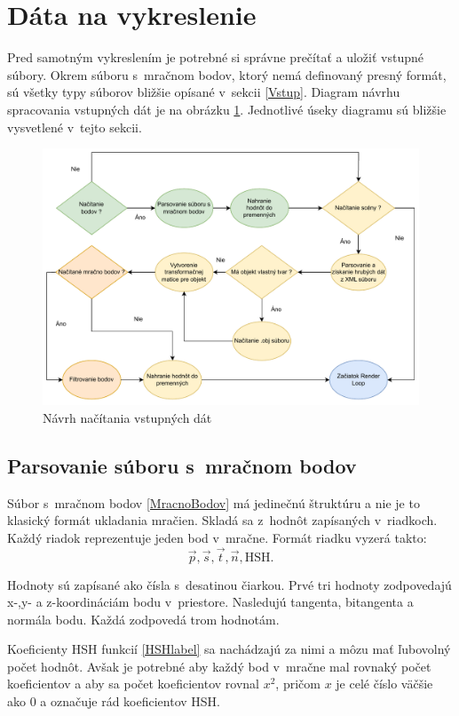 \section{Dáta na vykreslenie}
\label{DataVykreslenie}
\label{DataNavrh}
Pred samotným vykreslením je potrebné si správne prečítať a uložiť vstupné súbory. Okrem súboru s~mračnom bodov, ktorý nemá definovaný presný formát, sú všetky typy súborov bližšie opísané v~sekcii \ref{Vstup}. Diagram návrhu spracovania vstupných dát je na obrázku \ref{diaVstup}. Jednotlivé úseky diagramu sú bližšie vysvetlené v~tejto sekcii.

\begin{figure}[b!] \label{diaVstup}
    \centering
    \includegraphics[width=0.80\linewidth]{obrazky-figures/dataLoad.pdf}
    \caption{Návrh načítania vstupných dát}
\end{figure}
\newpage

\subsection*{Parsovanie súboru s~mračnom bodov}
\label{PointCloudParse}
Súbor s~mračnom bodov \ref{MracnoBodov} má jedinečnú štruktúru a nie je to klasický formát ukladania mračien. Skladá sa z~hodnôt zapísaných v~riadkoch. Každý riadok reprezentuje jeden bod v~mračne. Formát riadku vyzerá takto: $$\Vec{p}, \Vec{s}, \Vec{t}, \Vec{n}, \text{HSH.}$$ 

Hodnoty sú zapísané ako čísla s~desatinou čiarkou. Prvé tri hodnoty zodpovedajú x-,y- a z-koordináciám bodu v~priestore. Nasledujú tangenta, bitangenta a normála bodu. Každá zodpovedá trom hodnotám. 

Koeficienty HSH funkcií \ref{HSHlabel} sa nachádzajú za nimi a môzu mať ľubovolný počet hodnôt. Avšak je potrebné aby každý bod v~mračne mal rovnaký počet koeficientov a aby sa počet koeficientov rovnal $x^2$, pričom $x$ je celé číslo väčšie ako $0$ a označuje rád koeficientov HSH. 

